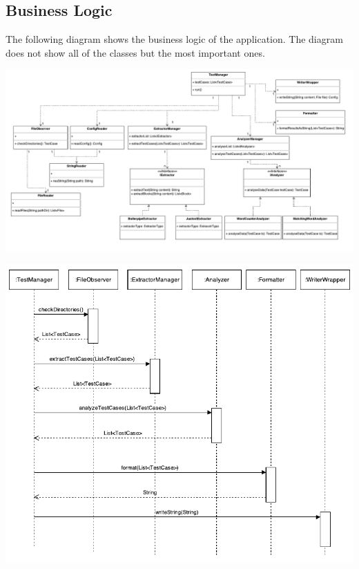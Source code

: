 \begin{landscape}

\section{Business Logic}
\label{subsec:Business Logic}

The following diagram shows the business logic of the application. The diagram does not show all of the classes but the most important ones. 

\includegraphics[width=23cm]{Figures/architecutre.pdf}

\end{landscape}

\includegraphics[width=15cm]{Figures/activityDiagram.pdf}

